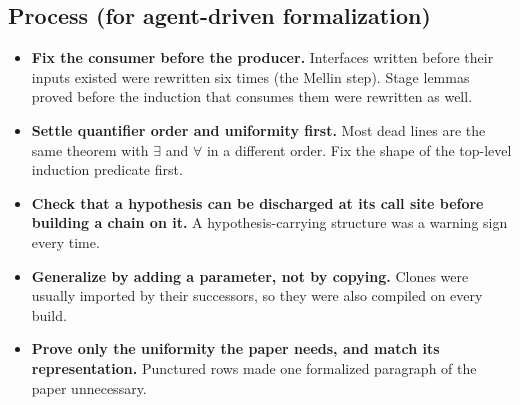 \documentclass[11pt,a4paper]{article}
\begin{document}
\subsection*{Process (for agent-driven formalization)}
\begin{itemize}
\item \textbf{Fix the consumer before the producer.} Interfaces written before their inputs existed
were rewritten six times (the Mellin step). Stage lemmas proved before the induction that consumes
them were rewritten as well.
\item \textbf{Settle quantifier order and uniformity first.} Most dead lines are the same theorem
with $\exists$ and $\forall$ in a different order. Fix the shape of the top-level induction
predicate first.
\item \textbf{Check that a hypothesis can be discharged at its call site before building a chain on
it.} A hypothesis-carrying structure was a warning sign every time.
\item \textbf{Generalize by adding a parameter, not by copying.} Clones were usually imported by
their successors, so they were also compiled on every build.
\item \textbf{Prove only the uniformity the paper needs, and match its representation.} Punctured
rows made one formalized paragraph of the paper unnecessary.
\end{itemize}
\end{document}

